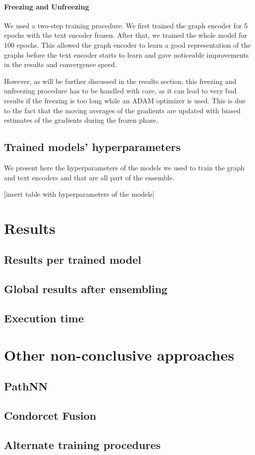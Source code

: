 \documentclass[switch, 12pt]{article}
\begin{document}
\begin{multicols}{2}
    \paragraph*{Freezing and Unfreezing}
    We used a two-step training procedure. We first trained the graph encoder for 5 epochs with the text encoder frozen. After that, we trained the whole model for 100 epochs. This allowed the graph encoder to learn a good representation of the graphs before the text encoder starts to learn and gave noticeable improvements in the results and convergence speed.

    However, as will be further discussed in the results section, this freezing and unfreezing procedure has to be handled with care, as it can lead to very bad results if the freezing is too long while an ADAM optimizer is used. This is due to the fact that the moving averages of the gradients are updated with biased estimates of the gradients during the frozen phase.

    \subsection{Trained models' hyperparameters}
    We present here the hyperparameters of the models we used to train the graph and text encoders and that are all part of the ensemble.

        [insert table with hyperparameters of the models]
    \section{Results}
    \subsection{Results per trained model}
    \subsection{Global results after ensembling}
    \subsection{Execution time}

    \section{Other non-conclusive approaches}
    \label{sec:non-conclusive}
    \subsection{PathNN}
    \subsection{Condorcet Fusion}
    \subsection{Alternate training procedures}

    \newpage

    

\end{multicols}
\end{document}
